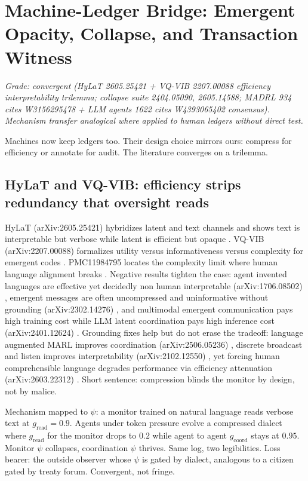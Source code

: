 \documentclass[11pt]{article}
\begin{document}
\section{Machine-Ledger Bridge: Emergent Opacity, Collapse, and Transaction Witness}
\label{sec:machine-bridge}

\textit{Grade: convergent (HyLaT 2605.25421 + VQ-VIB 2207.00088 efficiency interpretability trilemma; collapse suite 2404.05090, 2605.14588; MADRL 934 cites W3156295478 + LLM agents 1622 cites W4393065402 consensus). Mechanism transfer analogical where applied to human ledgers without direct test.}

Machines now keep ledgers too. Their design choice mirrors ours: compress for efficiency or annotate for audit. The literature converges on a trilemma.

\subsection{HyLaT and VQ-VIB: efficiency strips redundancy that oversight reads}
HyLaT (arXiv:2605.25421) hybridizes latent and text channels and shows text is interpretable but verbose while latent is efficient but opaque \citep{hylat2025}. VQ-VIB (arXiv:2207.00088) formalizes utility versus informativeness versus complexity for emergent codes \citep{vqvib2022}. PMC11984795 locates the complexity limit where human language alignment breaks \citep{pmc11984795}. Negative results tighten the case: agent invented languages are effective yet decidedly non human interpretable (arXiv:1706.08502) \citep{lazaridou2017}, emergent messages are often uncompressed and uninformative without grounding (arXiv:2302.14276) \citep{ec2023survey}, and multimodal emergent communication pays high training cost while LLM latent coordination pays high inference cost (arXiv:2401.12624) \citep{ec2024cost}. Grounding fixes help but do not erase the tradeoff: language augmented MARL improves coordination (arXiv:2506.05236) \citep{marl2025lang}, discrete broadcast and listen improves interpretability (arXiv:2102.12550) \citep{discrete2021}, yet forcing human comprehensible language degrades performance via efficiency attenuation (arXiv:2603.22312) \citep{efficiency2026}. Short sentence: compression blinds the monitor by design, not by malice.

Mechanism mapped to $\psi$: a monitor trained on natural language reads verbose text at $g_{\text{read}}=0.9$. Agents under token pressure evolve a compressed dialect where $g_{\text{read}}$ for the monitor drops to $0.2$ while agent to agent $g_{\text{coord}}$ stays at $0.95$. Monitor $\psi$ collapses, coordination $\psi$ thrives. Same log, two legibilities. Loss bearer: the outside observer whose $\psi$ is gated by dialect, analogous to a citizen gated by treaty forum. Convergent, not fringe.
\end{document}
